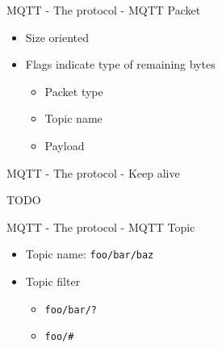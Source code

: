 \begin{frame}{MQTT - The protocol - MQTT Packet}
\protect\hypertarget{mqtt---the-protocol---mqtt-packet}{}

\begin{itemize}
\tightlist
\item
  Size oriented
\item
  Flags indicate type of remaining bytes

  \begin{itemize}
  \tightlist
  \item
    Packet type
  \item
    Topic name
  \item
    Payload
  \end{itemize}
\end{itemize}


\end{frame}

\begin{frame}{MQTT - The protocol - Keep alive}
\protect\hypertarget{mqtt---the-protocol---keep-alive}{}

TODO

\end{frame}

\begin{frame}[fragile]{MQTT - The protocol - MQTT Topic}
\protect\hypertarget{mqtt---the-protocol---mqtt-topic}{}

\begin{itemize}
\tightlist
\item
  Topic name: \texttt{foo/bar/baz}
\item
  Topic filter

  \begin{itemize}
  \tightlist
  \item
    \texttt{foo/bar/?}
  \item
    \texttt{foo/\#}
  \end{itemize}
\end{itemize}

\end{frame}

